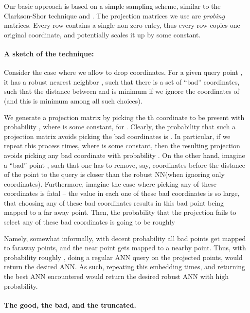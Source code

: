 \documentclass[12pt]{article}\usepackage[cm]{fullpage}
\newcommand{\Term}[1]{\textsf{#1}}
\theoremstyle{remark}\theoremheaderfont{\sf}\theorembodyfont{\upshape}\newtheorem{defn}[theorem]{Definition}
\numberwithin{figure}{section}\numberwithin{table}{section}\numberwithin{equation}{section}
\renewcommand{\th}{th\xspace}
\newcommand{\ANN}{\Term{ANN}\xspace}\newcommand{\NN}{\Term{NN}\xspace}
\begin{document}
Our basic approach is based on a simple sampling scheme, similar to
the Clarkson-Shor technique \cite{cs-arscg-89} and \LSH
\cite{him-anntr-12}.  The projection matrices we use are
\emph{probing} matrices. Every row contains a single non-zero entry,
thus every row copies one original coordinate, and potentially scales
it up by some constant.
  
\paragraph{A sketch of the technique:} 

Consider the case where we allow to drop  coordinates.  For a given
query point , it has a robust nearest neighbor
, such that there is a set  of 
``bad'' coordinates, such that the distance between  and
 is minimum if we ignore the  coordinates of 
(and this is minimum among all such choices).

We generate a projection matrix by picking the \th coordinate to be
present with probability , where  is some
constant, for .  Clearly, the probability that such a
projection matrix avoids picking the  bad coordinates is
. In particular, if
we repeat this process  times, where  is some
constant, then the resulting projection avoids picking any bad
coordinate with probability
. On the
other hand, imagine a ``bad'' point , such that one
has to remove, say,  coordinates before the
distance of the point to the query  is closer than the robust
\NN  (when ignoring only  coordinates). Furthermore, imagine
the case where picking any of these coordinates is fatal -- the value
in each one of these bad coordinates is so large, that choosing any of
these bad coordinates results in this bad point being mapped to a far
away point. Then, the probability that the projection fails to select
any of these bad coordinates is going to be roughly

Namely, somewhat informally, with decent probability all bad points
get mapped to faraway points, and the near point gets mapped to a
nearby point. Thus, with probability roughly
, doing a regular \ANN query on the
projected points, would return the desired \ANN. As such, repeating
this embedding  times, and returning
the best \ANN encountered would return the desired robust \ANN with
high probability.



\paragraph{The good, the bad, and the truncated.}
\end{document}

